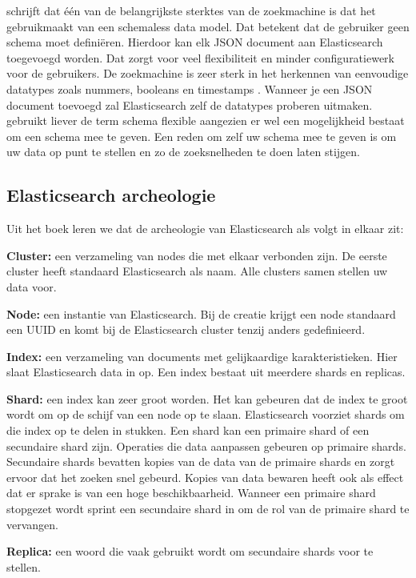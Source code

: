 \textcite{Gausser2012} schrijft dat één van de belangrijkste sterktes van de zoekmachine is dat het gebruikmaakt van een schemaless data model. Dat betekent dat de gebruiker geen schema moet definiëren. Hierdoor kan elk JSON document aan Elasticsearch toegevoegd worden. Dat zorgt voor veel flexibiliteit en minder configuratiewerk voor de gebruikers. De zoekmachine is zeer sterk in het herkennen van eenvoudige datatypes zoals nummers, booleans en timestamps \autocite{Brasetvik2013s}. Wanneer je een JSON document toevoegd zal Elasticsearch zelf de datatypes proberen uitmaken. \textcite{Brasetvik2013s} gebruikt liever de term schema flexible aangezien er wel een mogelijkheid bestaat om een schema mee te geven. Een reden om zelf uw schema mee te geven is om uw data op punt te stellen en zo de zoeksnelheden te doen laten stijgen. 

\subsection{Elasticsearch archeologie}

Uit het boek \textcite{Dixit2016} leren we dat de archeologie van Elasticsearch als volgt in elkaar zit:

\textbf{Cluster:} een verzameling van nodes die met elkaar verbonden zijn. De eerste cluster heeft standaard Elasticsearch als naam. Alle clusters samen stellen uw data voor. 

\textbf{Node:} een instantie van Elasticsearch. Bij de creatie krijgt een node standaard een UUID en komt bij de Elasticsearch cluster tenzij anders gedefinieerd.

\textbf{Index:} een verzameling van documents met gelijkaardige karakteristieken. Hier slaat Elasticsearch data in op. Een index bestaat uit meerdere shards en replicas. 

\textbf{Shard:} een index kan zeer groot worden. Het kan gebeuren dat de index te groot wordt om op de schijf van een node op te slaan. Elasticsearch voorziet shards om die index op te delen in stukken. Een shard kan een primaire shard of een secundaire shard zijn. Operaties die data aanpassen gebeuren op primaire shards. Secundaire shards bevatten kopies van de data van de primaire shards en zorgt ervoor dat het zoeken snel gebeurd. Kopies van data bewaren heeft ook als effect dat er sprake is van een hoge beschikbaarheid. Wanneer een primaire shard stopgezet wordt sprint een secundaire shard in om de rol van de primaire shard te vervangen.

\textbf{Replica:} een woord die vaak gebruikt wordt om secundaire shards voor te stellen.

